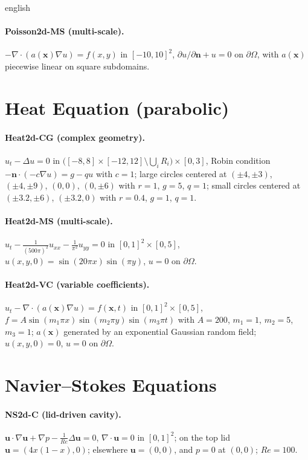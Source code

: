 \begin{hyphenrules}{english}
\paragraph{Poisson2d-MS (multi-scale).} $-\nabla\cdot(a(\mathbf{x})\nabla u)=f(x,y)$ in $[-10,10]^2$,
$\partial u/\partial\mathbf{n}+u=0$ on $\partial\Omega$, with $a(\mathbf{x})$ piecewise linear on square subdomains.

\section{Heat Equation (parabolic)}
\paragraph{Heat2d-CG (complex geometry).} $u_t-\Delta u=0$ in
$\big([-8,8]\times[-12,12]\setminus\bigcup_iR_i\big)\times[0,3]$, Robin condition
$-\mathbf{n}\cdot(-c\nabla u)=g-qu$ with $c=1$; large circles centered at $(\pm4,\pm3)$, $(\pm4,\pm9)$, $(0,0)$,
$(0,\pm6)$ with $r=1$, $g=5$, $q=1$; small circles centered at $(\pm3.2,\pm6)$, $(\pm3.2,0)$ with $r=0.4$,
$g=1$, $q=1$.

\paragraph{Heat2d-MS (multi-scale).} $u_t-\frac{1}{(500\pi)^2}u_{xx}-\frac{1}{\pi^2}u_{yy}=0$ in
$[0,1]^2\times[0,5]$, $u(x,y,0)=\sin(20\pi x)\sin(\pi y)$, $u=0$ on $\partial\Omega$.

\paragraph{Heat2d-VC (variable coefficients).} $u_t-\nabla\cdot(a(\mathbf{x})\nabla u)=f(\mathbf{x},t)$ in
$[0,1]^2\times[0,5]$, $f=A\sin(m_1\pi x)\sin(m_2\pi y)\sin(m_3\pi t)$ with $A=200$, $m_1=1$, $m_2=5$,
$m_3=1$; $a(\mathbf{x})$ generated by an exponential Gaussian random field; $u(x,y,0)=0$, $u=0$ on $\partial\Omega$.

\section{Navier--Stokes Equations}
\paragraph{NS2d-C (lid-driven cavity).} $\mathbf{u}\cdot\nabla\mathbf{u}+\nabla p-\frac{1}{Re}\Delta\mathbf{u}=0$,
$\nabla\cdot\mathbf{u}=0$ in $[0,1]^2$; on the top lid $\mathbf{u}=(4x(1-x),0)$; elsewhere $\mathbf{u}=(0,0)$,
and $p=0$ at $(0,0)$; $Re=100$.


\end{hyphenrules}
